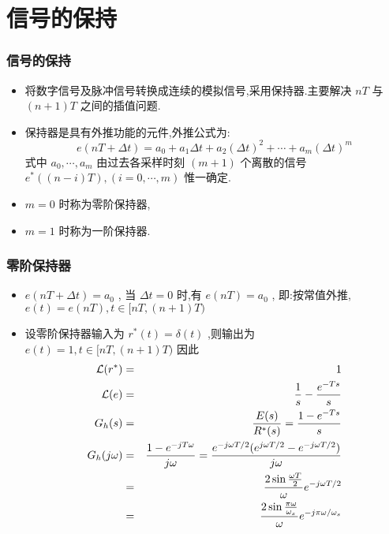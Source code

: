 \documentclass[table]{beamer}
\begin{document}
\section{信号的保持}
\label{sec-3}
\begin{frame}
\frametitle{信号的保持}
\label{sec-3-1}

\begin{itemize}
\item <2->将数字信号及脉冲信号转换成连续的模拟信号,采用保持器.主要解决  $nT$  与  $(n+1)T$  之间的插值问题.
\item <3->保持器是具有外推功能的元件,外推公式为:  
         \[e(nT+\Delta t)=a_0+a_1 \Delta t+a_2(\Delta t)^2+\cdots+a_m(\Delta t)^m\]
   式中  $a_0,\cdots,a_m$  由过去各采样时刻  $(m+1)$ 个离散的信号  $e^*((n-i)T),(i=0,\cdots,m)$  惟一确定.
\item <4-> $m=0$ 时称为零阶保持器,
\item <5-> $m=1$ 时称为一阶保持器.
\end{itemize}
\end{frame}
\begin{frame}
\frametitle{零阶保持器}
\label{sec-3-2}

\begin{itemize}
\item <2-> $e(nT+\Delta t)=a_0$  , 当  $\Delta t=0$  时,有  $e(nT)=a_0$ , 即:按常值外推,  $e(t)=e(nT),t\in [ nT,(n+1)T)$
\item <3-> 设零阶保持器输入为  $r^*(t)=\delta(t)$  ,则输出为  $e(t)=1,t\in [ nT,(n+1)T)$  因此
     \begin{eqnarray*}
     {\cal L} (r^*) &=& 1 \\
     {\cal L} (e) &=& \frac{1}{s}-\frac{e^{-Ts}}{s} \\
     G_h(s) &=& \frac{E(s)}{R^*(s)}
            = \frac{1-e^{-Ts}}{s} \\
     G_h(j\omega) &= &\frac{1-e^{-jT\omega}}{j\omega} 
      = \frac{e^{-j\omega T/2}(e^{j\omega T/2}-e^{-j\omega T/2})}{j\omega}\\
      &=& \frac{2\sin\frac{\omega T}{2}}{\omega}e^{-j\omega T/2} \\
      &=& \frac{2\sin\frac{\pi\omega}{\omega_s}}{\omega}e^{-j\pi\omega /\omega_s} 
     \end{eqnarray*}
\end{itemize}
\end{frame}
\end{document}

